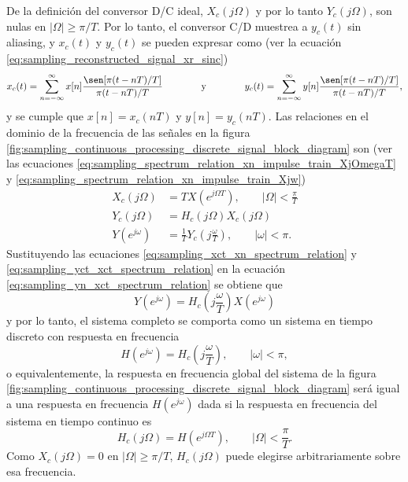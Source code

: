 \documentclass[a4paper]{report}
\begin{document}
De la definición del conversor D/C ideal, \(X_c(j\Omega)\) y por lo tanto \(Y_c(j\Omega)\), son nulas en \(|\Omega|\geq\pi/T\). Por lo tanto, el conversor C/D muestrea a \(y_c(t)\) sin aliasing, y \(x_c(t)\) y \(y_c(t)\) se pueden expresar como (ver la ecuación \ref{eq:sampling_reconstructed_signal_xr_sinc})
\[
 x_c(t)=\sum_{n=-\infty}^\infty x[n]\frac{\sen[\pi(t-nT)/T]}{\pi(t-nT)/T}
 \qquad\qquad\textrm{y}\qquad\qquad
 y_c(t)=\sum_{n=-\infty}^\infty y[n]\frac{\sen[\pi(t-nT)/T]}{\pi(t-nT)/T},
\]
y se cumple que \(x[n]=x_c(nT)\) y \(y[n]=y_c(nT)\). Las relaciones en el dominio de la frecuencia de las señales en la figura \ref{fig:sampling_continuous_processing_discrete_signal_block_diagram} son (ver las ecuaciones \ref{eq:sampling_spectrum_relation_xn_impulse_train_XjOmegaT} y \ref{eq:sampling_spectrum_relation_xn_impulse_train_Xjw})
\begin{align}
 X_c(j\Omega)&=TX(e^{j\Omega T}),\qquad|\Omega|<\frac{\pi}{T}\label{eq:sampling_xct_xn_spectrum_relation}\\
 Y_c(j\Omega)&=H_c(j\Omega)X_c(j\Omega)\label{eq:sampling_yct_xct_spectrum_relation}\\
 Y(e^{j\omega})&=\frac{1}{T}Y_c\left(j\frac{\omega}{T}\right),\qquad|\omega|<\pi.\label{eq:sampling_yn_xct_spectrum_relation}
\end{align}
Sustituyendo las ecuaciones \ref{eq:sampling_xct_xn_spectrum_relation} y \ref{eq:sampling_yct_xct_spectrum_relation} en la ecuación \ref{eq:sampling_yn_xct_spectrum_relation} se obtiene que
\[
 Y(e^{j\omega})=H_c\left(j\frac{\omega}{T}\right)X(e^{j\omega})
\]
y por lo tanto, el sistema completo se comporta como un sistema en tiempo discreto con respuesta en frecuencia
\begin{equation}\label{eq:sampling_continuous_processing_discrete_signal_H_Hc_relation}
 H(e^{j\omega})=H_c\left(j\frac{\omega}{T}\right),
 \qquad|\omega|<\pi, 
\end{equation}
o equivalentemente, la respuesta en frecuencia global del sistema de la figura \ref{fig:sampling_continuous_processing_discrete_signal_block_diagram} será igual a una respuesta en frecuencia \(H(e^{j\omega})\) dada si la respuesta en frecuencia del sistema en tiempo continuo es
\begin{equation}\label{eq:sampling_continuous_processing_discrete_signal_Hc_H_relation}
 H_c(j\Omega)=H(e^{j\Omega T}),
 \qquad|\Omega|<\frac{\pi}{T}. 
\end{equation}
Como \(X_c(j\Omega)=0\) en \(|\Omega|\geq\pi/T\), \(H_c(j\Omega)\) puede elegirse arbitrariamente sobre esa frecuencia.
\end{document}
